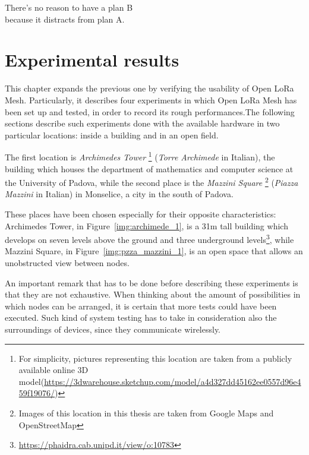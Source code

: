 
\begin{savequote}[60mm]
	There's no reason to have a plan B\\
	because it distracts from plan A.
\end{savequote}

\chapter{Experimental results}\label{chapter:results}
	
	This chapter expands the previous one by verifying the usability of Open LoRa Mesh.
	Particularly, it describes four experiments in which Open LoRa Mesh has been set up and tested, in order to record its rough performances.The following sections describe such experiments done with the available hardware in two particular locations: inside a building and in an open field.
	
	The first location is \textit{Archimedes Tower} \footnote{ For simplicity, pictures representing this location are taken from a publicly available online 3D model\newline (\url{https://3dwarehouse.sketchup.com/model/a4d327dd45162ee0557d96e459f19076/})} (\textit{Torre Archimede} in Italian), the building which houses the department of mathematics and computer science at the University of Padova, while the second place is the \textit{Mazzini Square} \footnote{ Images of this location in this thesis are taken from Google Maps and OpenStreetMap} (\textit{Piazza Mazzini} in Italian) in Monselice, a city in the south of Padova.
	
	These places have been chosen especially for their opposite characteristics: Archimedes Tower, in Figure~\ref{img:archimede_1}, is a 31m tall building which develops on seven levels above the ground and three underground levels\footnote{ \url{https://phaidra.cab.unipd.it/view/o:10783}}, while Mazzini Square, in Figure~\ref{img:pzza_mazzini_1}, is an open space that allows an unobstructed view between nodes.
	
	An important remark that has to be done before describing these experiments is that they are not exhaustive.
	When thinking about the amount of possibilities in which nodes can be arranged, it is certain that more tests could have been executed.
	Such kind of system testing has to take in consideration also the surroundings of devices, since they communicate wirelessly.
	
